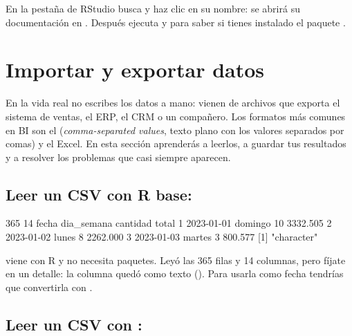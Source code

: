 \begin{hazlotu}
En la pestaña  de RStudio busca  y haz clic
en su nombre: se abrirá su documentación en . Después ejecuta
 y
 para saber si
tienes instalado el paquete .
\end{hazlotu}

\section{Importar y exportar datos}
\label{sec:m1-importar}

En la vida real no escribes los datos a mano: vienen de archivos que
exporta el sistema de ventas, el ERP, el CRM o un compañero. Los formatos
más comunes en BI son el  (\emph{comma-separated values},
texto plano con los valores separados por comas) y el Excel. En esta
sección aprenderás a leerlos, a guardar tus resultados y a resolver los
problemas que casi siempre aparecen.

\subsection{Leer un CSV con R base: \texorpdfstring{}{read.csv()}}

\begin{rsalida}
[1] 365  14
       fecha dia_semana cantidad    total
1 2023-01-01    domingo       10 3332.505
2 2023-01-02      lunes        8 2262.000
3 2023-01-03     martes        3  800.577
[1] "character"
\end{rsalida}

 viene con R y no necesita paquetes. Leyó las 365 filas
y 14 columnas, pero fíjate en un detalle: la columna  quedó
como texto (). Para usarla como fecha tendrías que
convertirla con .

\subsection{Leer un CSV con \texorpdfstring{}{readr}: \texorpdfstring{}{read\_csv()}}

